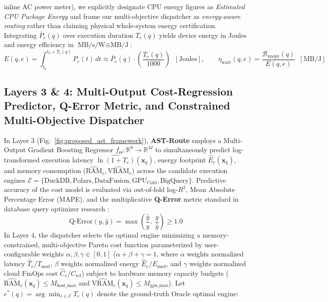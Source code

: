 \documentclass[10pt,a4paper]{article}
\begin{document}
\begin{enumerate}[leftmargin=1.5em,itemsep=3pt]
inline AC power meter), we explicitly designate CPU energy figures as \emph{Estimated CPU Package Energy} and frame our multi-objective dispatcher as \emph{energy-aware routing} rather than claiming physical whole-system energy certification. Integrating $\bar{P}_e(q)$ over execution duration $T_e(q)$ yields device energy in Joules and energy efficiency in $\text{MB/s/W} \equiv \text{MB/J}$:
\begin{equation}
        E(q, e) = \int_{t_0}^{t_0 + T_e(q)} P_e(t)\,dt \approx \bar{P}_e(q) \cdot \left(\frac{T_e(q)}{1000}\right) \;\; [\text{Joules}], \qquad \eta_{\text{watt}}(q, e) = \frac{\mathcal{B}_{\text{unopt}}(q)}{E(q, e)} \;\; [\text{MB/J}]
    \end{equation}
\end{enumerate}

\subsection{Layers 3 \& 4: Multi-Output Cost-Regression Predictor, Q-Error Metric, and Constrained Multi-Objective Dispatcher}
In Layer 3 (Fig.~\ref{fig:proposed_ast_framework}), \textbf{AST-Route} employs a Multi-Output Gradient Boosting Regressor $f_{\Theta}: \mathbb{R}^{9} \rightarrow \mathbb{R}^{M}$ to simultaneously predict log-transformed execution latency $\widehat{\ln(1 + T_e)}(\mathbf{x}_q)$, energy footprint $\hat{E}_e(\mathbf{x}_q)$, and memory consumption ($\widehat{\text{RAM}}_e, \widehat{\text{VRAM}}_e$) across the candidate execution engines $\mathcal{E} = \{\text{DuckDB}, \text{Polars}, \text{DataFusion}, \text{GPU}_{\text{Cold}}, \text{BigQuery}\}$. Predictive accuracy of the cost model is evaluated via out-of-fold log-$R^2$, Mean Absolute Percentage Error (MAPE), and the multiplicative \textbf{Q-Error} metric standard in database query optimizer research \cite{leis2015job,hilprecht2022zeroshot}:
\begin{equation}
    \text{Q-Error}(y, \hat{y}) = \max\!\left( \frac{\hat{y}}{y},\; \frac{y}{\hat{y}} \right) \ge 1.0
\end{equation}
In Layer 4, the dispatcher selects the optimal engine minimizing a memory-constrained, multi-objective Pareto cost function parameterized by user-configurable weights $\alpha, \beta, \gamma \in [0, 1]$ ($\alpha + \beta + \gamma = 1$, where $\alpha$ weights normalized latency $\hat{T}_e/T_{\text{med}}$, $\beta$ weights normalized energy $\hat{E}_e/E_{\text{med}}$, and $\gamma$ weights normalized cloud FinOps cost $\hat{C}_e/C_{\text{ref}}$) subject to hardware memory capacity budgets ($\widehat{\text{RAM}}_e(\mathbf{x}_q) \le M_{\text{host\_max}}$ and $\widehat{\text{VRAM}}_e(\mathbf{x}_q) \le M_{\text{gpu\_max}}$). Let $e^*(q) = \arg\min_{e \in \mathcal{E}} T_e(q)$ denote the ground-truth Oracle optimal engine:
\end{document}

